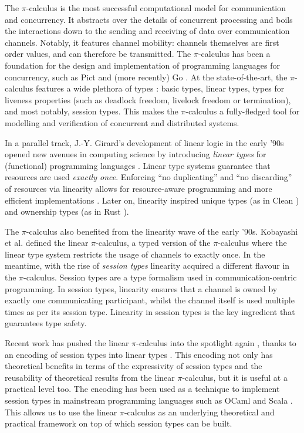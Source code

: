 \documentclass[a4paper,UKenglish,cleveref,autoref,thm-restate,authorcolumns]{lipics-v2019}
\theoremstyle{definition}
\newcommand{\picalc}{$\pi$-calculus}
\begin{document}
The \picalc{} \cite{MilnerPW92,Milner99} is the most successful computational model for communication and concurrency.
It abstracts over the details of concurrent processing and boils the interactions down to the sending and receiving of data over communication channels.
Notably, it features channel mobility: channels themselves are first order values, and can therefore be transmitted.
The \picalc{} has been a foundation for the design and implementation of programming languages for concurrency, such as Pict \cite{Pierce} and (more recently) Go \cite{Golang}.
At the state-of-the-art, the \picalc{} features a wide plethora of types \cite{K07}: basic types, linear types, types for liveness properties (such as deadlock freedom, livelock freedom or termination), and most notably, session types. This makes the \picalc{} a fully-fledged tool for modelling and verification of concurrent and distributed systems.

In a parallel track, J.-Y. Girard's development of linear logic \cite{Girard87} in the early '90s opened new avenues in computing science by introducing \emph{linear types} for (functional) programming languages \cite{Curry-Howard,Wadler90,Bernardy2018}.
Linear type systems guarantee that resources are used \emph{exactly once}.
Enforcing ``no duplicating'' and ``no discarding'' of resources via linearity allows for resource-aware programming and more efficient implementations \cite{Wadler90}.
Later on, linearity inspired unique types (as in Clean \cite{BarendsenS96}) and ownership types (as in Rust \cite{MatsakisK14}).

The \picalc{} also benefited from the linearity wave of the early '90s.
Kobayashi et al. \cite{KPT96} defined the {linear} \picalc{}, a typed version of the \picalc{} where the linear type system restricts the usage of channels to exactly once.
%
In the meantime, with the rise of \emph{session types} \cite{H93,THK94,HVK98} linearity acquired a different flavour in the \picalc{}.
Session types are a type formalism used in communication-centric programming.
In session types, linearity ensures that a channel is owned by exactly one communicating participant, whilst the channel itself is used multiple times as per its session type.
Linearity in session types is the key ingredient that guarantees type safety.

Recent work has pushed the linear \picalc{} into the spotlight again \cite{KPT96}, thanks to an encoding of session types into linear types \cite{DardhaGS12,Dardha14,DardhaGS17}.
This encoding not only has theoretical benefits in terms of the expressivity of session types and the reusability of theoretical results from the linear \picalc{}, but it is useful at a practical level too.
The encoding has been used as a technique to implement session types in mainstream programming languages such as OCaml \cite{Padovani17} and Scala \cite{ScalasY16,ScalasDHY17}.
This allows us to use the linear \picalc{} as an underlying theoretical and practical framework on top of which session types can be built.
\end{document}

